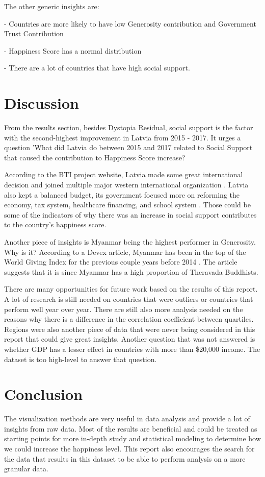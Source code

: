 \documentclass[11pt,twocolumn]{article}
\begin{document}
The other generic insights are:

- Countries are more likely to have low Generosity contribution and Government Trust Contribution

- Happiness Score has a normal distribution

- There are a lot of countries that have high social support.

\section{Discussion}
From the results section, besides Dystopia Residual, social support is the factor with the second-highest improvement in Latvia from 2015 - 2017. It urges a question 'What did Latvia do between 2015 and 2017 related to Social Support that caused the contribution to Happiness Score increase?  

According to the BTI project website, Latvia made some great international decision and joined multiple major western international organization \cite{bti-latvia}. Latvia also kept a balanced budget, its government focused more on reforming the economy, tax system, healthcare financing, and school system \cite{bti-latvia}. Those could be some of the indicators of why there was an increase in social support contributes to the country's happiness score.

Another piece of insights is Myanmar being the highest performer in Generosity. Why is it? According to a Devex article, Myanmar has been in the top of the World Giving Index for the previous couple years before 2014 \cite{myanmar}. The article suggests that it is since Myanmar has a high proportion of Theravada Buddhists.

There are many opportunities for future work based on the results of this report. A lot of research is still needed on countries that were outliers or countries that perform well year over year. There are still also more analysis needed on the reasons why there is a difference in the correlation coefficient between quartiles. Regions were also another piece of data that were never being considered in this report that could give great insights. Another question that was not answered is whether GDP has a lesser effect in countries with more than \$20,000 income. The dataset is too high-level to answer that question. 

\section{Conclusion}
The visualization methods are very useful in data analysis and provide a lot of insights from raw data. Most of the results are beneficial and could be treated as starting points for more in-depth study and statistical modeling to determine how we could increase the happiness level. This report also encourages the search for the data that results in this dataset to be able to perform analysis on a more granular data. 
\end{document}
